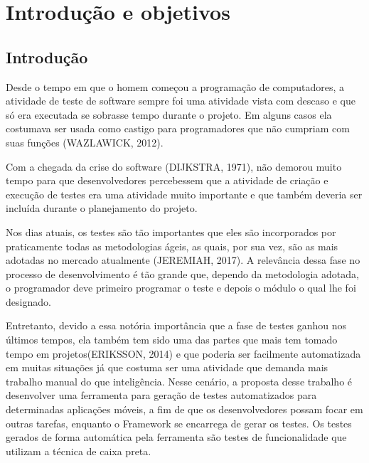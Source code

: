 \documentclass[
    12pt,       %
    openright,      %
    twoside,      %
    a4paper,      %
    english,      %
    french,       %
    spanish,      %
    brazil,       %
    ]{abntex2}
\begin{document}
  \tableofcontents*
  \cleardoublepage



  \textual


  \chapter{Introdução e objetivos}
  \section{Introdução}
      Desde o tempo em que o homem começou a programação de computadores, a atividade
  de teste de software sempre foi uma atividade vista com descaso e que só era
  executada se sobrasse tempo durante o projeto. Em alguns casos ela costumava ser
  usada como castigo para programadores que não cumpriam com suas funções
  (WAZLAWICK, 2012).

  Com a chegada da crise do software (DIJKSTRA, 1971), não demorou muito tempo
  para que desenvolvedores percebessem que a atividade de criação e execução de
  testes era uma atividade muito importante e que também deveria ser
  incluída durante o planejamento do projeto.

  Nos dias atuais, os testes são tão importantes que eles são incorporados
  por praticamente todas as metodologias ágeis, as quais, por sua vez,
  são as mais adotadas no mercado atualmente (JEREMIAH, 2017). A relevância dessa fase
  no processo de desenvolvimento é tão grande que, dependo da metodologia
  adotada, o programador deve primeiro programar o teste e depois o módulo
  o qual lhe foi designado.

  Entretanto, devido a essa notória importância que a fase de testes ganhou nos
  últimos tempos, ela também tem sido uma das partes que mais tem tomado tempo
  em projetos(ERIKSSON, 2014) e que poderia ser facilmente automatizada em muitas situações já que
  costuma ser uma atividade que demanda mais trabalho manual do que inteligência.
  Nesse cenário, a proposta desse trabalho é desenvolver uma ferramenta para
  geração de testes automatizados para determinadas aplicações móveis, a fim de
  que os desenvolvedores possam focar em outras tarefas, enquanto
  o Framework se encarrega de gerar os testes. Os testes gerados de forma automática
  pela ferramenta são testes de funcionalidade que utilizam a técnica de caixa preta.
\end{document}
